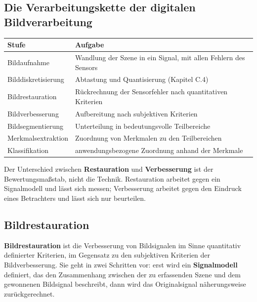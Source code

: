 \documentclass[12pt, a4paper]{article}
\begin{document}
\subsection{Die Verarbeitungskette der digitalen Bildverarbeitung}

\begin{center}
\begin{tabular}{@{}p{3.6cm}p{9.4cm}@{}}
\toprule
\textbf{Stufe} & \textbf{Aufgabe} \\
\midrule
Bildaufnahme & Wandlung der Szene in ein Signal, mit allen Fehlern des Sensors \\
Bilddiskretisierung & Abtastung und Quantisierung (Kapitel C.4) \\
Bildrestauration & Rückrechnung der Sensorfehler nach quantitativen Kriterien \\
Bildverbesserung & Aufbereitung nach subjektiven Kriterien \\
Bildsegmentierung & Unterteilung in bedeutungsvolle Teilbereiche \\
Merkmalsextraktion & Zuordnung von Merkmalen zu den Teilbereichen \\
Klassifikation & anwendungsbezogene Zuordnung anhand der Merkmale \\
\bottomrule
\end{tabular}
\end{center}

\begin{notebox}
Der Unterschied zwischen \textbf{Restauration} und \textbf{Verbesserung} ist der
Bewertungsmaßstab, nicht die Technik. Restauration arbeitet gegen ein Signalmodell und
lässt sich messen; Verbesserung arbeitet gegen den Eindruck eines Betrachters und lässt
sich nur beurteilen.
\end{notebox}

\subsection{Bildrestauration}

\begin{definitionbox}
\textbf{Bildrestauration} ist die Verbesserung von Bildsignalen im Sinne quantitativ
definierter Kriterien, im Gegensatz zu den subjektiven Kriterien der Bildverbesserung.
Sie geht in zwei Schritten vor: erst wird ein \textbf{Signalmodell} definiert, das den
Zusammenhang zwischen der zu erfassenden Szene und dem gewonnenen Bildsignal
beschreibt, dann wird das Originalsignal näherungsweise zurückgerechnet.
\end{definitionbox}
\end{document}
